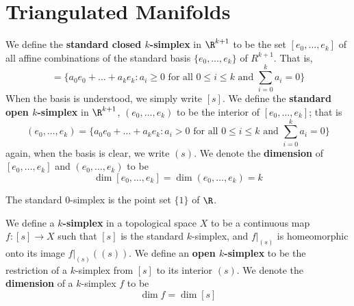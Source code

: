 \section{Triangulated Manifolds}

\begin{definition}
    We define the \textbf{standard closed $k$-simplex} in $\R^{k+1}$ to be the
    set $[e_0, \dots, e_k]$ of all affine combinations of the standard
    basis $\{e_0, \dots, e_k\}$ of $R^{k+1}$. That is,
    \begin{equation*}
        [e_0, \dots, e_k]=\{a_0e_0+\dots+a_ke_k : a_i \geq 0 \text{ for all }
        0 \leq i \leq k \text{ and } \sum_{i=0}^k{a_i}=0\}
    \end{equation*}
    When the basis is understood, we simply write $[s]$. We define the
    \textbf{standard open $k$-simplex} in $\R^{k+1}$, $(e_0, \dots, e_k)$ to be
    the interior of $[e_0, \dots, e_k]$; that is
     \begin{equation*}
        (e_0, \dots, e_k)=\{a_0e_0+\dots+a_ke_k : a_i>0 \text{ for all }
        0 \leq i \leq k \text{ and } \sum_{i=0}^k{a_i}=0\}
    \end{equation*}
    again, when the basis is clear, we write $(s)$. We denote the
    \textbf{dimension} of $[e_0, \dots, e_k]$ and $(e_0, \dots, e_k)$ to be
    \begin{equation*}
        \dim{[e_0, \dots, e_k]}=\dim{(e_0, \dots, e_k)}=k
    \end{equation*}
\end{definition}

\begin{example}\label{example_1.11}
    The standard $0$-simplex is the point set  $\{1\}$ of $\R$.
\end{example}

\begin{definition}
    We define a \textbf{$k$-simplex} in a topological space $X$ to be a
    continuous map  $f:[s] \xrightarrow{} X$ such that $[s]$ is the standard
    $k$-simplex, and  $f|_{(s)}$ is homeomorphic onto its image $f|_{(s)}((s))$.
    We define an \textbf{open $k$-simplex} to be the restriction of a
    $k$-simplex from  $[s]$ to its interior $(s)$. We denote the
    \textbf{dimension} of a $k$-simplex  $f$ to be
    \begin{equation*}
        \dim{f}=\dim{[s]}
    \end{equation*}
\end{definition}

